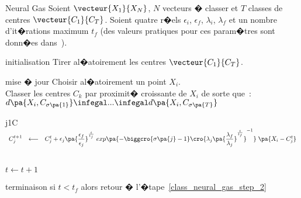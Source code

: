         \begin{xalgorithm}{Neural Gas}
        \label{classif_algo_neural_gas}
        Soient $\vecteur{X_1}{X_N}$, $N$ vecteurs � classer et $T$ classes de centres $\vecteur{C_1}{C_T}$. 
        Soient quatre r�els $\epsilon_i$,  $\epsilon_f$, $\lambda_i$, $\lambda_f$ et un nombre 
        d'it�rations maximum $t_f$ (des valeurs pratiques pour ces param�tres sont donn�es 
        dans~).

        \begin{xalgostep}{initialisation}
        Tirer al�atoirement les centres $\vecteur{C_1}{C_T}$. \\
        \end{xalgostep}

        \begin{xalgostep}{mise � jour} \label{class_neural_gas_step_2}
        Choisir al�atoirement un point $X_i$. \\
        Classer les centres $C_k$ par proximit� croissante de $X_i$ de sorte que~:
        $d\pa{X_i,C_{\sigma\pa{1}}} \infegal ... \infegal d\pa{X_i,C_{\sigma\pa{T}}}$ \\
        \begin{xfor}{j}{1}{C}
        $
        \begin{array}{lcl}
        C_j^{t+1} &\longleftarrow&  C_j^t +      \epsilon_j \pa{\dfrac{\epsilon_f}{\epsilon_j}}^{\frac{t}{t_f}} \; 
                                                                                    exp\pa{
                                                                                            - \biggcro{ \sigma\pa{j} - 1 }  
                                                                                            \cro{ \lambda_j \pa{\dfrac{\lambda_f}{\lambda_j}}^{\frac{t}{t_f}} } ^{-1}
                                                                                    }
                                                                                    \; \pa{ X_i - C_j^t    }
        \end{array}                                                                
        $
        \end{xfor} \\
        $ t \longleftarrow t+1$
        \end{xalgostep}

        \begin{xalgostep}{terminaison} \label{class_rpcl_step_3}
        si $t < t_f$ alors retour � l'�tape~\ref{class_neural_gas_step_2}
        \end{xalgostep}

        \end{xalgorithm}


